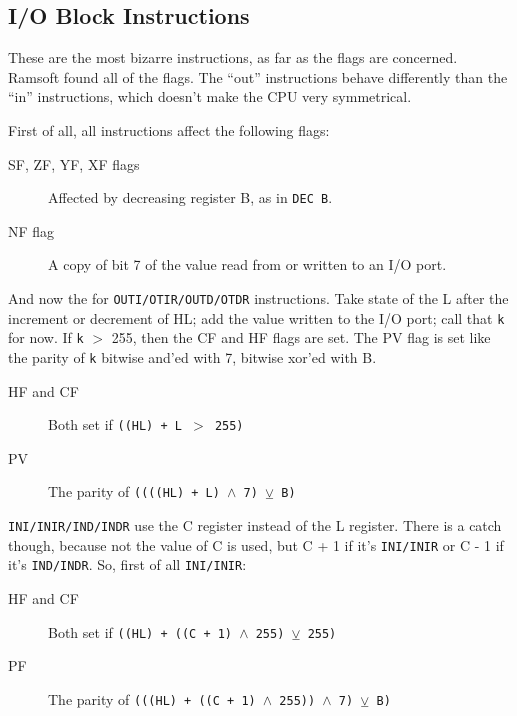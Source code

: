 \documentclass[12pt,twoside,openright,a4paper]{book}
\begin{document}
\pagebreak
\subsection{I/O Block Instructions}
\label{block_io}

These are the most bizarre instructions, as far as the flags are concerned. Ramsoft found all of the flags. The ``out'' instructions behave differently than the ``in'' instructions, which doesn't make the CPU very symmetrical. 

First of all, all instructions affect the following flags:

\begin{description}

	\item[SF, ZF, YF, XF flags]
	Affected by decreasing register B, as in {\tt DEC B}.

	\item[NF flag]
	A copy of bit 7 of the value read from or written to an I/O port.

\end{description}

And now the for {\tt OUTI/OTIR/OUTD/OTDR} instructions. Take state of the L after the increment or decrement of HL; add the value written to the I/O port; call that {\tt k} for now. If {\tt k} $>$ 255, then the CF and HF flags are set. The PV flag is set like the parity of {\tt k} bitwise and'ed with 7, bitwise xor'ed with B.

\begin{description}

	\item[HF and CF]
	Both set if {\tt ((HL) + L  $>$ 255)}

	\item[PV]
	The parity of {\tt ((((HL) + L) $\wedge$ 7) $\veebar$ B)}

\end{description}

{\tt INI/INIR/IND/INDR} use the C register instead of the L register. There is a catch though, because not the value of C is used, but C + 1 if it's {\tt INI/INIR} or C - 1 if it's {\tt IND/INDR}. So, first of all {\tt INI/INIR}:

\begin{description}

	\item[HF and CF]
	Both set if {\tt ((HL) + ((C + 1) $\wedge$ 255)  $\veebar$ 255)}

	\item[PF]
	The parity of {\tt (((HL) + ((C + 1) $\wedge$ 255)) $\wedge$ 7) $\veebar$ B)}

\end{description}
\end{document}
